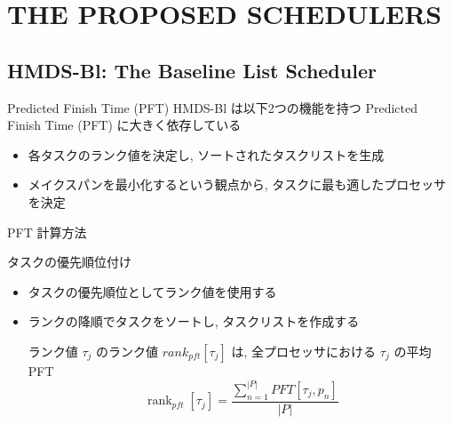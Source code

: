 
\section{THE PROPOSED SCHEDULERS}
\label{sec: the proposed schedulers}


\subsection{HMDS-Bl: The Baseline List Scheduler}
\label{ssec: hmds-bl: the baseline list scheduler}

\begin{frame}{Predicted Finish Time (PFT)}
    HMDS-Bl は以下2つの機能を持つ Predicted Finish Time (PFT) に大きく依存している
    \begin{itemize}
        \item 各タスクのランク値を決定し, ソートされたタスクリストを生成
        \item メイクスパンを最小化するという観点から, タスクに最も適したプロセッサを決定
    \end{itemize}
\end{frame}

\begin{frame}{PFT 計算方法}
\end{frame}

\begin{frame}{タスクの優先順位付け}
    \begin{itemize}
        \item タスクの優先順位としてランク値を使用する
        \item ランクの降順でタスクをソートし, タスクリストを作成する
              \begin{block}{ランク値}
                  $\tau_j$ のランク値 $rank_{pft}[\tau_j]$ は, 全プロセッサにおける $\tau_j$ の平均 PFT
                  \begin{equation}
                      \operatorname{rank}_{p f t}\left[\tau_j\right]=\frac{\sum_{n=1}^{|P|} P F T\left[\tau_j, p_n\right]}{|P|}
                  \end{equation}
              \end{block}
    \end{itemize}
\end{frame}

